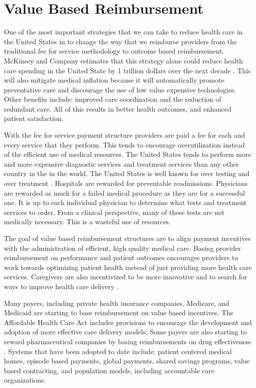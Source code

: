 \documentclass[sigconf]{acmart}
\begin{document}
\section{Value Based Reimbursement}
One of the most important strategies that we can take to reduce health care in the United States in to change the way that we reimburse providers from the traditional fee for service methodology to outcome based reimbursement.  McKinsey and Company estimates that this strategy alone could reduce health care spending in the United State by 1 trillion dollars over the next decade \cite{www-google-trillion}.  This will also mitigate medical inflation because it will automatically promote preventative care and discourage the use of low value expensive technologies.  Other benefits include:  improved care coordination and the reduction of redundant care.  All of this results in better health outcomes, and enhanced patient satisfaction.

With the fee for service payment structure providers are paid a fee for each and every service that they perform. This tends to encourage overutilization instead of the efficient use of medical resources. The United States tends to perform more and more expensive diagnostic services and treatment services than any other country in the in the world. The United States is well known for over testing and over treatment \cite{www-google-PBSO}.  Hospitals are rewarded for preventable readmissions. Physicians are rewarded as much for a failed medical procedure as they are for a successful one.  It is up to each individual physician to determine what tests and treatment services to order.  From a clinical perspective, many of these tests are not medically necessary. This is a wasteful use of resources.

The goal of value based reimbursement structures are to align payment incentives with the administration of efficient, high quality medical care. Basing provider reimbursement on performance and patient outcomes encourages providers to work towards optimizing patient health instead of just providing more health care services.  Caregivers are also incentivized to be more innovative and to search for ways to improve health care delivery \cite{www-google-christian}.

Many payers, including private health insurance companies, Medicare, and Medicaid are starting to base reimbursement on value based incentives.  The Affordable Health Care Act includes provisions to encourage the development and adoption of more effective care delivery models.  Some payers are also starting to reward pharmaceutical companies by basing reimbursements on drug effectiveness \cite{www-google-McKinsey}.  Systems that have been adopted to date include: patient centered medical homes, episode based payments, global payments, shared savings programs, value based contracting, and population models, including accountable care organizations.
\end{document}
